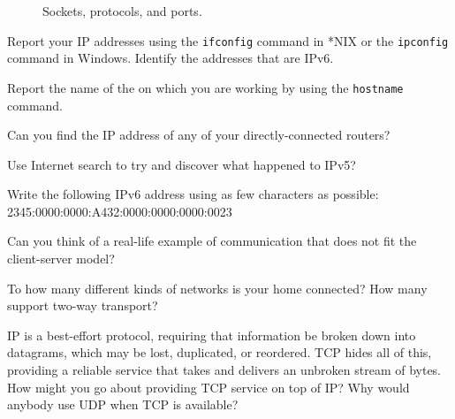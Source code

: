 \begin{figure}[htbp]
\caption{Sockets, protocols, and ports.\label{fig:sockstack}}
\end{figure}

\begin{exercises}

\item Report your IP addresses using the \texttt{ifconfig} command in *NIX or 
the \texttt{ipconfig} command in Windows.  Identify the addresses that are
IPv6.

\item Report the name of the on which you are working by using the 
\texttt{hostname} command.

\item Can you find the IP address of any of your directly-connected routers?

\item Use Internet search to try and discover what happened to IPv5?

\item Write the following IPv6 address using as few characters as possible:
2345:0000:0000:A432:0000:0000:0000:0023

\item Can you think of a real-life example of communication that does
not fit the client-server model?

\item To how many different kinds of networks is your home connected?
How many support two-way transport?

\item IP is a best-effort protocol, requiring that information
be broken down into datagrams, which may be lost, duplicated, or
reordered.  TCP hides all of this, providing a reliable service that
takes and delivers an unbroken stream of bytes.  How might you go
about providing TCP service on top of IP?  Why would anybody use UDP
when TCP is available?

\end{exercises}
